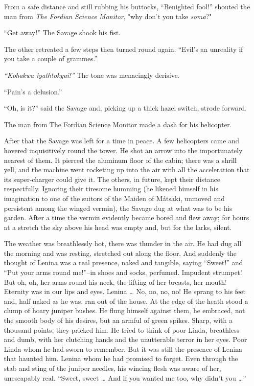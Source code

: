 \documentclass[12pt]{report}
\begin{document}
From a safe distance and still rubbing his buttocks, ``Benighted fool!''
shouted the man from \emph{The Fordian Science Monitor}, "why don't you
take \emph{soma}?"

``Get away!'' The Savage shook his fist.

The other retreated a few steps then turned round again. ``Evil's an
unreality if you take a couple of grammes.''

\emph{``Kohakwa iyathtokyai!''} The tone was menacingly derisive.

``Pain's a delusion.''

``Oh, is it?'' said the Savage and, picking up a thick hazel switch,
strode forward.

The man from The Fordian Science Monitor made a dash for his helicopter.

After that the Savage was left for a time in peace. A few helicopters
came and hovered inquisitively round the tower. He shot an arrow into
the importunately nearest of them. It pierced the aluminum floor of the
cabin; there was a shrill yell, and the machine went rocketing up into
the air with all the acceleration that its super-charger could give it.
The others, in future, kept their distance respectfully. Ignoring their
tiresome humming (he likened himself in his imagination to one of the
suitors of the Maiden of Mátsaki, unmoved and persistent among the
winged vermin), the Savage dug at what was to be his garden. After a
time the vermin evidently became bored and flew away; for hours at a
stretch the sky above his head was empty and, but for the larks, silent.

The weather was breathlessly hot, there was thunder in the air. He had
dug all the morning and was resting, stretched out along the floor. And
suddenly the thought of Lenina was a real presence, naked and tangible,
saying ``Sweet!'' and ``Put your arms round me!''--in shoes and socks,
perfumed. Impudent strumpet! But oh, oh, her arms round his neck, the
lifting of her breasts, her mouth! Eternity was in our lips and eyes.
Lenina \ldots{} No, no, no, no! He sprang to his feet and, half naked as
he was, ran out of the house. At the edge of the heath stood a clump of
hoary juniper bushes. He flung himself against them, he embraced, not
the smooth body of his desires, but an armful of green spikes. Sharp,
with a thousand points, they pricked him. He tried to think of poor
Linda, breathless and dumb, with her clutching hands and the unutterable
terror in her eyes. Poor Linda whom he had sworn to remember. But it was
still the presence of Lenina that haunted him. Lenina whom he had
promised to forget. Even through the stab and sting of the juniper
needles, his wincing flesh was aware of her, unescapably real. ``Sweet,
sweet \ldots{} And if you wanted me too, why didn't you \ldots{}''
\end{document}
